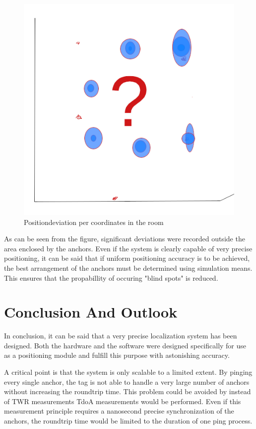 \documentclass[10pt,a4paper,twocolumn]{article}
\begin{document}
\begin{figure}[H]
  \includegraphics[scale=0.35]{images/position_plot.png}
  \caption{Positiondeviation per coordinates in the room}
\end{figure}

As can be seen from the figure, significant deviations were recorded outside the area enclosed by the anchors.
Even if the system is clearly capable of very precise positioning, it can be said that if uniform positioning accuracy is to be achieved,
the best arrangement of the anchors must be determined using simulation means.
This ensures that the propabillity of occuring "blind spots" is reduced.

\section{Conclusion And Outlook}\label{section:conclusion}
In conclusion, it can be said that a very precise localization system has been designed.
Both the hardware and the software were designed specifically for use as a positioning module and fulfill this purpose with astonishing accuracy.

A critical point is that the system is only scalable to a limited extent.
By pinging every single anchor, the tag is not able to handle a very large number of anchors without increasing the roundtrip time.
This problem could be avoided by instead of \ac{TWR} measurements \ac{TdoA} measurements would be performed.
Even if this measurement principle requires a nanosecond precise synchronization of the anchors,
the roundtrip time would be limited to the duration of one ping process.
\end{document}
